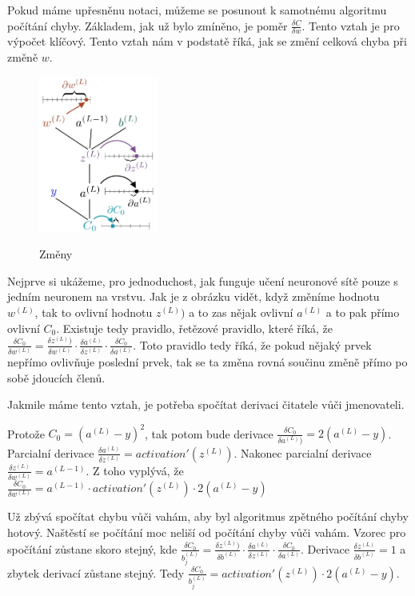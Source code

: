 Pokud máme upřesněnu notaci, můžeme se posunout k samotnému algoritmu počítání chyby.
Základem, jak už bylo zmíněno, je poměr \(\frac{\delta C}{\delta w}\). Tento vztah je pro výpočet klíčový.
Tento vztah nám v podstatě říká, jak se změní celková chyba při změně \(w\).

\begin{figure}[h]
    \centering
    \includegraphics[width=0.35\textwidth]{images/delta.png}
    \caption{Změny} \cite{delta}
\end{figure}

Nejprve si ukážeme, pro jednoduchost, jak funguje učení neuronové sítě pouze s jedním neuronem na vrstvu. Jak je z obrázku vidět, když změníme hodnotu \(w^{(L)}\), tak to ovlivní hodnotu \(z^{(L)})\) a to zas nějak ovlivní \(a^{(L)}\) a to pak přímo ovlivní \(C_0\).
Existuje tedy pravidlo, řetězové pravidlo\cite{chain_rule}, které říká, že \(\frac{\delta C_0}{\delta w^{(L)}} = \frac{\delta z^{(L)})}{\delta w^{(L)}} \cdot \frac{\delta a^{(L)}}{\delta z^{(L)}} \cdot \frac{\delta C_0}{\delta a^{(L)}}\).
Toto pravidlo tedy říká, že pokud nějaký prvek nepřímo ovlivňuje poslední prvek, tak se ta změna rovná součinu změně přímo po sobě jdoucích členů.

Jakmile máme tento vztah, je potřeba spočítat derivaci čitatele vůči jmenovateli.

Protože \(C_0 = (a^{(L)} - y)^2\), tak potom bude derivace \(\frac{\delta C_0}{\delta a^{(L)})}= 2(a^{(L)} - y)\).
Parcialní derivace \(\frac{\delta a^{(L)}}{\delta z^{(L)}} = activation'(z^{(L)}) \).
Nakonec parcialní derivace \(\frac{\delta z^{(L)}}{\delta w^{(L)}} = a^{(L-1)}\).
Z toho vyplývá, že \(\frac{\delta C_0}{\delta w^{(L)}} = a^{(L-1)} \cdot activation'(z^{(L)}) \cdot 2(a^{(L)} - y)\)

Už zbývá spočítat chybu vůči vahám, aby byl algoritmus zpětného počítání chyby hotový.
Naštěstí se počítání moc neliší od počítání chyby vůči vahám.
Vzorec pro spočítání zůstane skoro stejný, kde \(\frac{\delta C_0}{b_j^{(L)}} = \frac{\delta z^{(L)})}{\delta b^{(L)}} \cdot \frac{\delta a^{(L)}}{\delta z^{(L)}} \cdot \frac{\delta C_0}{\delta a^{(L)}} \).
Derivace \(\frac{\delta z^{(L)}}{\delta b^{(L)}} = 1 \) a zbytek derivací zůstane stejný. Tedy \(\frac{\delta C_0}{b_j^{(L)}} =  activation'(z^{(L)}) \cdot 2(a^{(L)} - y)\).

